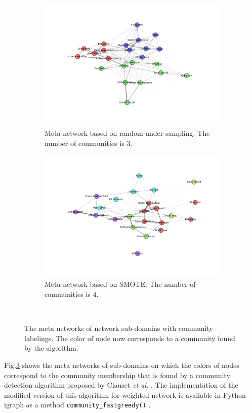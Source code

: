 \documentclass{article}
\begin{document}
\begin{figure}[H]
	\medskip
	\begin{subfigure}{0.48\textwidth}
	\includegraphics[width=\linewidth]{figs/similarity/SubDomain/RandomUnder_all5/graph_community.png}
	\caption{Meta network based on random under-sampling.  The number of communities is $3$.} \label{random_under_graph_sub_community}
	\end{subfigure}\hspace*{\fill}
	\begin{subfigure}{0.48\textwidth}
	\includegraphics[width=\linewidth]{figs/similarity/SubDomain/SMOTE/graph_community.png}
	\caption{Meta network based on SMOTE.  The number of communities is $4$.} \label{SMOTE_graph_sub_community}
	\end{subfigure}
\
\caption{The meta networks of network sub-domains with community labelings. The color of node now corresponds to a community found by the algorithm.} \label{meta_network_community}
\end{figure}

Fig.\ref{meta_network_community} shows the meta networks of sub-domains on which the colors of nodes correspond to the community membership that is found by a community detection algorithm proposed by Clauset \textit{et al.} \cite{CNMAlgorithm}. The implementation of the modified version of this algorithm for weighted network is available in Python-igraph as a method \texttt{community\_fastgreedy()} \cite{igraph}.

\clearpage


 
\end{document}
